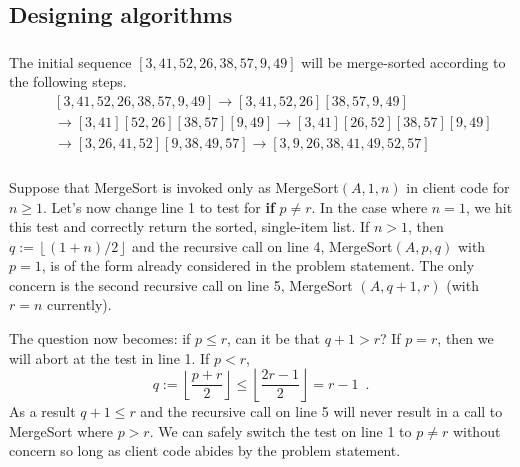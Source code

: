 \subsection{Designing algorithms}

\subsubsection{}
    The initial sequence $[3, 41, 52, 26, 38, 57, 9, 49]$ will be merge-sorted according to the following steps.
    \begin{eqnarray}
        \nonumber &\,& [3, 41, 52, 26, 38, 57, 9, 49] \to 
            [3, 41, 52, 26] [38, 57, 9, 49]
        \\ \nonumber &\,& \to
        [3, 41] [52, 26] [38, 57] [9, 49] \to
        [3, 41] [26, 52] [38, 57] [9, 49]
        \\ \nonumber &\,& \to
        [3, 26, 41, 52] [9, 38, 49, 57] \to
        [3, 9, 26, 38, 41, 49, 52, 57]
    \end{eqnarray}

\subsubsection{}
    Suppose that MergeSort is invoked only as MergeSort$(A, 1, n)$ in client code for $n\ge1$.  Let's now change line 1 to test for {\bf if }$p \neq r$.  In the case where $n=1$, we hit this test and correctly return the sorted, single-item list.  If $n>1$, then $q:=\left\lfloor (1 + n)/2\right\rfloor$ and the recursive call on line 4, MergeSort$(A, p, q)$ with $p=1$, is of the form already considered in the problem statement.  The only concern is the second recursive call on line 5, MergeSort $(A, q + 1, r)$ (with $r=n$ currently).  

    The question now becomes: if $p\le r$, can it be that $q + 1 > r$?  If $p=r$, then we will abort at the test in line 1.  If $p<r$, 
    \begin{equation}
        q:=\left\lfloor \frac{p + r}{2} \right\rfloor \le  \left\lfloor \frac{2 r - 1}{2} \right\rfloor = r - 1\,\,\,.
    \end{equation}
    As a result $q+1\le r$ and the recursive call on line 5 will never result in a call to MergeSort where $p>r$.  We can safely switch the test on line 1 to $p\neq r$ without concern so long as client code abides by the problem statement.